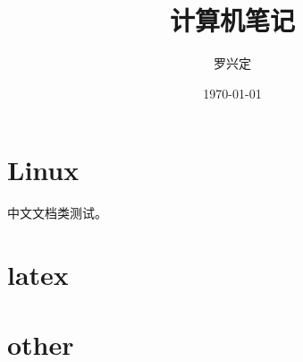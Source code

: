 \documentclass[UTF8]{ctexart}
\title{计算机笔记}
\author{罗兴定}
\date{\today}
\begin{document}
\maketitle
\tableofcontents

\part{Linux}
	
	  中文文档类测试。
\part{latex}
	
\part{other}
\end{document}
